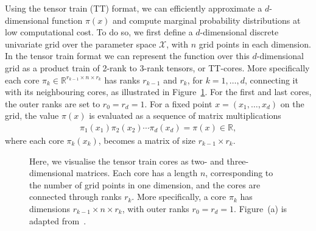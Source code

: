 Using the tensor train (TT) format, we can efficiently approximate a $d$-dimensional function $\pi(x)$ and compute marginal probability distributions at low computational cost. To do so, we first define a $d$-dimensional discrete univariate grid over the parameter space $\mathcal{X}$, with $n$ grid points in each dimension.
In the tensor train format we can represent the function over this $d$-dimensional grid as a product train of 2-rank to 3-rank tensors, or TT-cores. More specifically each core $\pi_k \in \mathbb{R}^{r_{k-1} \times n \times r_k}$ has ranks $r_{k-1}$ and $r_k$, for $k = 1, \dots, d$, connecting it with its neighbouring cores, as illustrated in Figure~\ref{fig:TTfig}.
For the first and last cores, the outer ranks are set to $r_0 = r_d = 1$.
For a fixed point $x = (x_1, \dots, x_d)$ on the grid, the value $\pi(x)$ is evaluated as a sequence of matrix multiplications 
\begin{align*}
\pi_1(x_1)  \pi_2(x_2)  \cdots \pi_d(x_d) = 	\pi(x)  \in \mathbb{R},
\end{align*}
where each core $\pi_k(x_k)$, becomes a matrix of size $r_{k-1} \times r_k$.
\begin{figure}[ht!]
	\centering
\begin{subfigure}{\textwidth}
	
	\caption{}
\end{subfigure}
	\centering
\begin{subfigure}{\textwidth}
	\caption{}
\end{subfigure}
\caption[Visualization of a tensor train]{Here, we visualise the tensor train cores as two- and three-dimensional matrices. 
Each core has a length $n$, corresponding to the number of grid points in one dimension, and the cores are connected through ranks $r_k$. 
More specifically, a core $\pi_k$ has dimensions $r_{k-1} \times n \times r_k$, with outer ranks $r_0 = r_d = 1$. 
Figure~(a) is adapted from~\cite{fox2021grid}.}
\label{fig:TTfig}
\end{figure}

